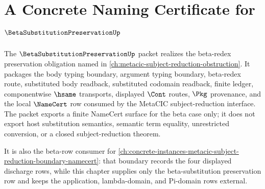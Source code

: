 \chapter{A Concrete Naming Certificate for $\BetaSubstitutionPreservationUp$}
\label{ch:concrete-instances-betasubstitutionpreservation-namecert}

The $\BetaSubstitutionPreservationUp$ packet realizes the beta-redex preservation obligation named in \autoref{ch:metacic-subject-reduction-obstruction}. It packages the body typing boundary, argument typing boundary, beta-redex route, substituted body readback, substituted codomain readback, finite ledger, componentwise $\hsame$ transports, displayed $\Cont$ routes, $\Pkg$ provenance, and the local $\NameCert$ row consumed by the MetaCIC subject-reduction interface. The packet exports a finite NameCert surface for the beta case only; it does not export host substitution semantics, semantic term equality, unrestricted conversion, or a closed subject-reduction theorem.

It is also the beta-row consumer for \autoref{ch:concrete-instances-metacic-subject-reduction-boundary-namecert}: that boundary records the four displayed discharge rows, while this chapter supplies only the beta-substitution preservation row and keeps the application, lambda-domain, and Pi-domain rows external.

